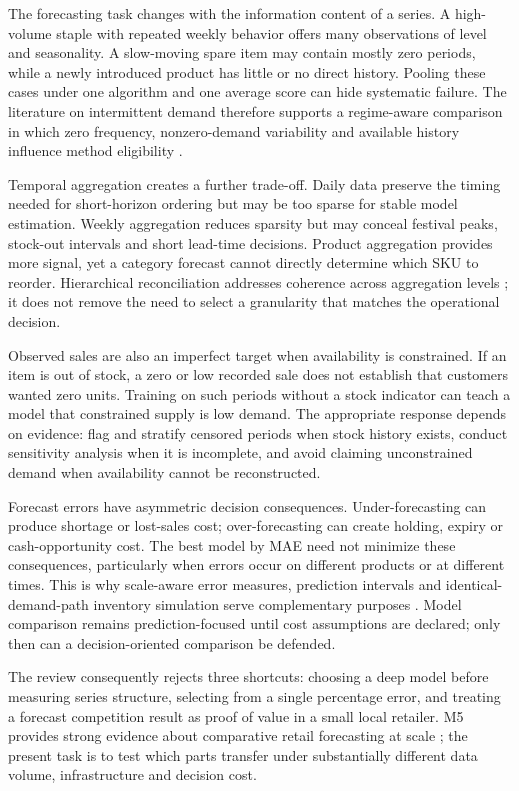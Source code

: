 The forecasting task changes with the information content of a series. A
high-volume staple with repeated weekly behavior offers many observations of
level and seasonality. A slow-moving spare item may contain mostly zero periods,
while a newly introduced product has little or no direct history. Pooling these
cases under one algorithm and one average score can hide systematic failure.
The literature on intermittent demand therefore supports a regime-aware
comparison in which zero frequency, nonzero-demand variability and available
history influence method eligibility \cite{croston1972intermittent,
syntetos2005intermittent}.

Temporal aggregation creates a further trade-off. Daily data preserve the
timing needed for short-horizon ordering but may be too sparse for stable model
estimation. Weekly aggregation reduces sparsity but may conceal festival peaks,
stock-out intervals and short lead-time decisions. Product aggregation provides
more signal, yet a category forecast cannot directly determine which SKU to
reorder. Hierarchical reconciliation addresses coherence across aggregation
levels \cite{hyndman2011hierarchical}; it does not remove the need to select a
granularity that matches the operational decision.

Observed sales are also an imperfect target when availability is constrained.
If an item is out of stock, a zero or low recorded sale does not establish that
customers wanted zero units. Training on such periods without a stock indicator
can teach a model that constrained supply is low demand. The appropriate
response depends on evidence: flag and stratify censored periods when stock
history exists, conduct sensitivity analysis when it is incomplete, and avoid
claiming unconstrained demand when availability cannot be reconstructed.

Forecast errors have asymmetric decision consequences. Under-forecasting can
produce shortage or lost-sales cost; over-forecasting can create holding,
expiry or cash-opportunity cost. The best model by MAE need not minimize these
consequences, particularly when errors occur on different products or at
different times. This is why scale-aware error measures, prediction intervals
and identical-demand-path inventory simulation serve complementary purposes
\cite{hyndman2006accuracy,syntetos2010stock}. Model comparison remains
prediction-focused until cost assumptions are declared; only then can a
decision-oriented comparison be defended.

The review consequently rejects three shortcuts: choosing a deep model before
measuring series structure, selecting from a single percentage error, and
treating a forecast competition result as proof of value in a small local
retailer. M5 provides strong evidence about comparative retail forecasting at
scale \cite{makridakis2022m5}; the present task is to test which parts transfer
under substantially different data volume, infrastructure and decision cost.

